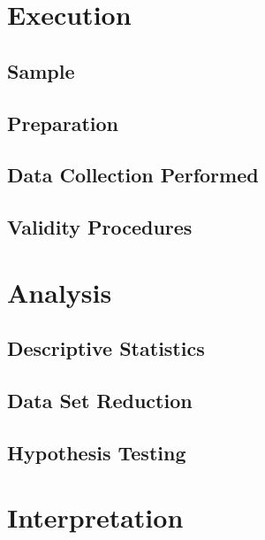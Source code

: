 \documentclass[conference,compsoc]{IEEEtran}
\begin{document}
\hypertarget{execution}{%
\section{Execution}\label{execution}}

\hypertarget{sample}{%
\subsection{Sample}\label{sample}}

\hypertarget{preparation}{%
\subsection{Preparation}\label{preparation}}

\hypertarget{data-collection-performed}{%
\subsection{Data Collection Performed}\label{data-collection-performed}}

\hypertarget{validity-procedures}{%
\subsection{Validity Procedures}\label{validity-procedures}}

\hypertarget{analysis}{%
\section{Analysis}\label{analysis}}

\hypertarget{descriptive-statistics}{%
\subsection{Descriptive Statistics}\label{descriptive-statistics}}

\hypertarget{data-set-reduction}{%
\subsection{Data Set Reduction}\label{data-set-reduction}}

\hypertarget{hypothesis-testing}{%
\subsection{Hypothesis Testing}\label{hypothesis-testing}}

\hypertarget{interpretation}{%
\section{Interpretation}\label{interpretation}}
\end{document}
